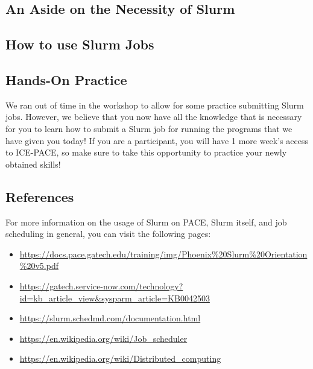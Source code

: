 \documentclass{article}
\begin{document}
\subsection{An Aside on the Necessity of Slurm}

\subsection{How to use Slurm Jobs}

\subsection{Hands-On Practice}

We ran out of time in the workshop to allow for some practice submitting Slurm jobs. However, we believe that you now have all the knowledge that is necessary for you to learn how to submit a Slurm job for running the programs that we have given you today! If you are a participant, you will have 1 more week's access to ICE-PACE, so make sure to take this opportunity to practice your newly obtained skills!

\subsection{References}

For more information on the usage of Slurm on PACE, Slurm itself, and job scheduling in general, you can visit the following pages:

\begin{itemize}
    \item \url{https://docs.pace.gatech.edu/training/img/Phoenix%20Slurm%20Orientation%20v5.pdf}
    \item \url{https://gatech.service-now.com/technology?id=kb_article_view&sysparm_article=KB0042503}
    \item \url{https://slurm.schedmd.com/documentation.html}
    \item \url{https://en.wikipedia.org/wiki/Job_scheduler}
    \item \url{https://en.wikipedia.org/wiki/Distributed_computing}
\end{itemize}
\end{document}
